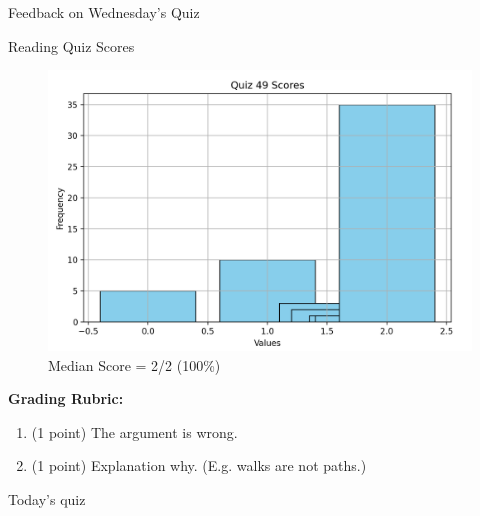 \documentclass[10pt]{beamer}
\begin{document}
\begin{frame}[standout]
Feedback on Wednesday's Quiz
\end{frame}


\begin{frame}{Reading Quiz Scores}
\small 
\begin{figure}[ht]
        \centering
        \includegraphics[width=.7\textwidth]{images/reading_quiz_scores}
   		 \caption{Median Score = 2/2 (100\%)}
\end{figure}
\vfill 
\textbf{Grading Rubric:}  
\begin{enumerate}
\item (1 point) The argument is wrong.
\item (1 point) Explanation why. (E.g. walks are not paths.)
\end{enumerate}

\end{frame}	




\begin{frame}[standout]
Today's quiz
\end{frame}
\end{document}
